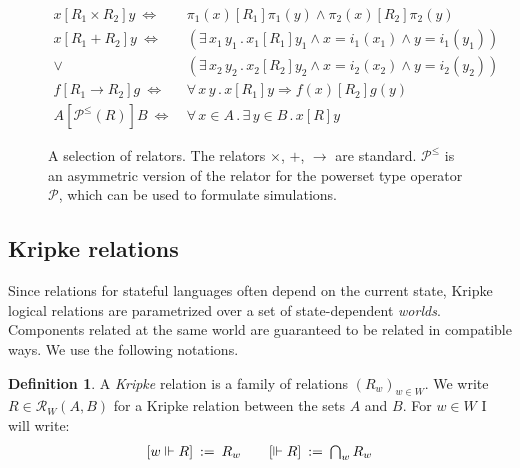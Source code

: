 \documentclass[11pt,oneside,draft]{book}
\theoremstyle{definition}
\newtheorem{definition}[theorem]{Definition}
\newcommand{\ifr}[1]{\mathrel{[{#1}]}}
\newcommand{\figsize}{}
\begin{document}
\begin{figure} %
  \figsize
  \begin{align*}
    x \ifr{R_1 \times R_2} y \ \Leftrightarrow\  &
      \pi_1(x) \ifr{R_1} \pi_1(y) \wedge
      \pi_2(x) \ifr{R_2} \pi_2(y) \\
    x \ifr{R_1 + R_2} y \ \Leftrightarrow\  &
      (\exists \, x_1 \, y_1 \,.\,
        x_1 \ifr{R_1} y_1 \wedge
        x = i_1(x_1) \wedge
        y = i_1(y_1)) \\ \vee\ &
      (\exists \, x_2 \, y_2 \,.\,
        x_2 \ifr{R_2} y_2 \wedge
        x = i_2(x_2) \wedge
        y = i_2(y_2)) \\
    f \ifr{R_1 \rightarrow R_2} g \ \Leftrightarrow\  &
      \forall \, x \, y \,.\,
        x \ifr{R_1} y \Rightarrow
        f(x) \ifr{R_2} g(y) \\
    A \ifr{\mathcal{P}^\le(R)} B \ \Leftrightarrow\  &
      \forall \, x \in A \,.\,
      \exists \, y \in B \,.\,
      x \ifr{R} y
  \end{align*}
  \caption[A selection of relators]%
   {A selection of relators.
    The relators $\times$, $+$, $\rightarrow$ are standard.
    $\mathcal{P}^\le$ is an asymmetric version of
    the relator for the powerset type operator $\mathcal{P}$,
    which can be used to formulate simulations.
    }
  \label{fig:relators}
\end{figure}


\subsection{Kripke relations}

Since relations for stateful languages
often depend on the current state,
Kripke logical relations
are parametrized over a set of state-dependent \emph{worlds}.
Components related at the same world
are guaranteed to be related in compatible ways.
We use the following notations.

\begin{definition} \label{def:klr} %
A \emph{Kripke} relation is
a family of relations $(R_w)_{w \in W}$.
We write $R \in \mathcal{R}_W(A, B)$
for a Kripke relation between the sets $A$ and $B$.
For $w \in W$ I will write:
\[
\begin{array}{c@{\qquad}c}
    [w \Vdash R] \: := \: R_w &
    [\Vdash R] \: := \: \bigcap_{w} R_w
\end{array}
\]
\end{definition}
\end{document}
